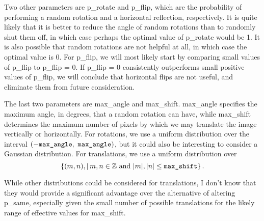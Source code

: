 Two other parameters are {\ttfamily p\_rotate} and {\ttfamily p\_flip}, which are the probability of performing a random rotation and a horizontal reflection, respectively. It is quite likely that it is better to reduce the angle of random rotations than to randomly shut them off, in which case perhaps the optimal value of {\ttfamily p\_rotate} would be 1. It is also possible that random rotations are not helpful at all, in which case the optimal value is 0. For {\ttfamily p\_flip}, we will most likely start by comparing small values of {\ttfamily p\_flip} to {\ttfamily p\_flip = 0}. If {\ttfamily p\_flip = 0} consistently outperforms small positive values of  {\ttfamily p\_flip}, we will conclude that horizontal flips are not useful, and eliminate them from future consideration.

The last two parameters are {\ttfamily max\_angle} and {\ttfamily max\_shift}. {\ttfamily max\_angle} specifies the maximum angle, in degrees, that a random rotation can have, while {\ttfamily max\_shift} determines the maximum number of pixels by which we may translate the image vertically or horizontally. For rotations, we use a uniform distribution over the interval $(-\textrm{\ttfamily max\_angle},\ \textrm{\ttfamily max\_angle})$, but it could also be interesting to consider a Gaussian distribution. For translations, we use a uniform distribution over \[\{(m,n)\\,|\,m,n \in\mathbb{Z}\textrm{\ and\ }|m|,|n|\le\textrm{\ttfamily max\_shift}\}\,.\]

While other distributions could be considered for translations, I don't know that they would provide a significant advantage over the alternative of altering {\ttfamily p\_same}, especially given the small number of possible translations for the likely range of effective values for {\ttfamily max\_shift}.